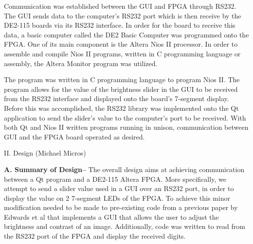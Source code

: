 \documentclass{article}
\begin{document}
\begin{multicols*}{2}
    Communication was established between the GUI and FPGA through RS232. The GUI sends data to the computer’s RS232 port which is then receive by the DE2-115 boards via its RS232 interface. In order for the board to receive this data, a basic computer called the DE2 Basic Computer was programmed onto the FPGA. One of its main component is the Altera Nios II processor. In order to assemble and compile Nios II programs, written in C programming language or assembly, the Altera Monitor program was utilized.

   The program was written in C programming language to program Nios II. The program allows for the value of the brightness slider in the GUI to be received from the RS232 interface and displayed onto the board’s 7-segment display. Before this was accomplished, the RS232 library was implemented onto the Qt application to send the slider’s value to the computer's port to be received. With both Qt  and Nios II written programs running in unison, communication between GUI and the FPGA board operated as desired.\\



\vspace{10 pt}
\begin{center}
{\large II. Design (Michael Micros)}
\end{center}

{\bf A. Summary of Design--}  
The overall design aims at achieving communication between a Qt program and a DE2-115 Altera FPGA. More specifically, we attempt to send a slider value used in a GUI over an RS232 port, in order to display the value on 2 7-segment LEDs of the FPGA. To achieve this minor modification needed to be made to pre-existing code from a previous paper by Edwards et al that implements a GUI that allows the user to adjust the brightness and contrast of an image. Additionally, code was written to read from the RS232 port of the FPGA and display the received digits.\\


\end{multicols*}
\end{document}

